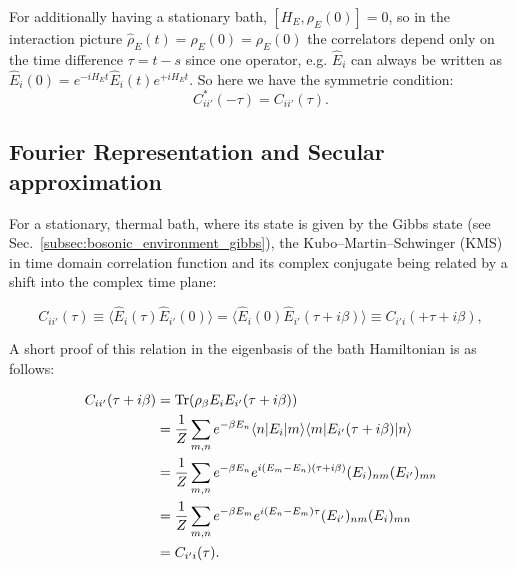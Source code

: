 \noindent
{}

\noindent
For additionally having a stationary bath, $[H_E, \rho_E(0)]=0$, so in the interaction picture $\hat{\rho}_E(t)=\hat{\rho}_E(0)=\rho_E(0)$ the correlators depend only on the time difference $\tau= t - s$ since one operator, e.g. $\hat{E}_{i}$ can always be written as $\hat{E}_{i}(0) = e^{-i H_E t} \hat{E}_i(t) e^{+i H_E t}$. So here we have the symmetrie condition:
\begin{equation}
	C^{*}_{ii'}(-\tau) = C_{ii'}(\tau).
\end{equation}


\subsection{Fourier Representation and Secular approximation}
\label{subsec:Fourier_and_secular}

\noindent
For a stationary, thermal bath, where its state is given by the Gibbs state (see Sec.~\ref{subsec:bosonic_environment_gibbs}), the Kubo--Martin--Schwinger (KMS) in time domain  correlation function and its complex conjugate being related by a shift into the complex time plane:

\begin{equation}
	C_{ii'}(\tau) \equiv \langle \hat{E}_{i}(\tau) \hat{E}_{i'}(0) \rangle  =  \langle \hat{E}_{i}(0) \hat{E}_{i'}(\tau + i \beta) \rangle  \equiv C_{i'i}(+\tau + i \beta),
	\label{eq:kms_time_relation}
\end{equation}

\noindent
A short proof of this relation in the eigenbasis of the bath Hamiltonian is as follows:

\begin{align}
	C_{ii'}(\tau + i \beta) &= \mathrm{Tr}(\rho_\beta E_i E_{i'}(\tau + i \beta)) \notag \\
	&= \frac{1}{Z} \sum_{m,n} e^{-\beta E_n} \langle n | E_i | m \rangle \langle m | E_{i'}(\tau + i \beta) | n \rangle \notag \\
	&= \frac{1}{Z} \sum_{m,n} e^{-\beta E_n} e^{i(E_m - E_n)(\tau + i \beta)} (E_i)_{nm} (E_{i'})_{mn} \notag \\
	&= \frac{1}{Z} \sum_{m,n} e^{-\beta E_m} e^{i(E_n - E_m)\tau} (E_{i'})_{nm} (E_i)_{mn} \notag \\
	&= C_{i'i}(\tau).
\end{align}



